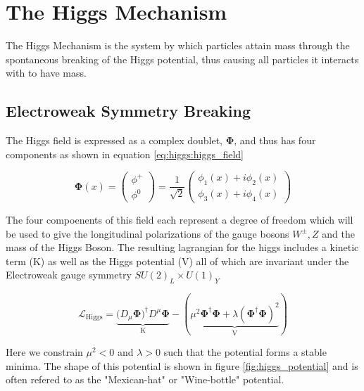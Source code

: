 \section{The Higgs Mechanism} \label{sec:theory:higgs}

The Higgs Mechanism is the system by which particles attain mass through the
spontaneous breaking of the Higgs potential, thus causing all particles it
interacts with to have mass.

\subsection{Electroweak Symmetry Breaking}

The Higgs field is expressed as a complex doublet, $\boldsymbol{\Phi}$, and thus
has four components as shown in equation \ref{eq:higgs:higgs_field}

\begin{equation} \label{eq:higgs:higgs_field}
\boldsymbol{\Phi}(x) = \left( \begin{matrix} \phi^{+} \\ \phi^{0} \end{matrix}
\right) = \frac{1}{\sqrt{2}} \left( \begin{matrix} \phi_{1}(x) + i\phi_{2}(x) \\
\phi_{3}(x) + i\phi_{4}(x) \end{matrix} \right)
\end{equation}

The four compoenents of this field each represent a degree of freedom which will
be used to give the longitudinal polarizations of the gauge bosons $W^{\pm},Z$
and the mass of the Higgs Boson.  The resulting lagrangian for the higgs
includes a kinetic term (K) as well as the Higgs potential (V) all of which are
invariant under the Electroweak gauge symmetry $SU(2)_L \times U(1)_Y$

\begin{equation}
\mathcal{L}_{\text{Higgs}} =
\underbrace{(D_{\mu}\boldsymbol{\Phi)^{\dagger}}D^{\mu}\boldsymbol{\Phi}}_{\text{K}}
- (\underbrace{\mu^{2}\boldsymbol{\Phi}^{\dagger}\boldsymbol{\Phi} +
  \lambda(\boldsymbol{\Phi}^{\dagger}\boldsymbol{\Phi})^{2}}_{\text{V}})
\end{equation}

Here we constrain $\mu^{2} < 0$ and $\lambda > 0$ such that the potential forms
a stable minima.  The shape of this potential is shown in figure
\ref{fig:higgs_potential} and is often refered to as the "Mexican-hat" or
"Wine-bottle" potential. 


